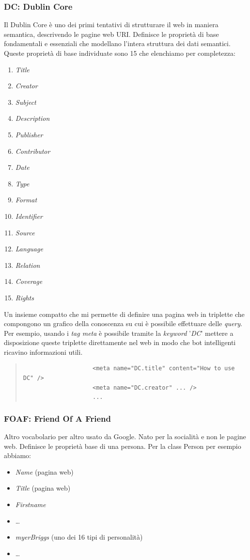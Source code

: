 				\subsubsection{DC: Dublin Core}
					Il Dublin Core è uno dei primi tentativi di strutturare il web in maniera semantica, descrivendo le pagine web URI. Definisce le proprietà di base fondamentali e essenziali che modellano l'intera struttura dei dati semantici. Queste proprietà di base individuate sono 15 che elenchiamo per completezza:
					\begin{enumerate}
						\item \emph{Title}
						\item \emph{Creator}
						\item \emph{Subject}
						\item \emph{Description}
						\item \emph{Publisher}
						\item \emph{Contributor}
						\item \emph{Date}
						\item \emph{Type}
						\item \emph{Format}
						\item \emph{Identifier}
						\item \emph{Source}
						\item \emph{Language}
						\item \emph{Relation}
						\item \emph{Coverage}
						\item \emph{Rights}
					\end{enumerate}
				Un insieme compatto che mi permette di definire una pagina web in triplette che compongono un grafico della conoscenza su cui è possibile effettuare delle \emph{query}.
				Per esempio, usando i \emph{tag meta} è possibile tramite la \emph{keyword} '\emph{DC}' mettere a disposizione queste triplette direttamente nel web in modo che bot intelligenti ricavino informazioni utili.
				\begin{quote}
				\begin{verbatim}
					<meta name="DC.title" content="How to use DC" />
					<meta name="DC.creator" ... />
					...
				\end{verbatim}
				\end{quote}
				
				\subsubsection{FOAF: Friend Of A Friend}
					Altro vocabolario per altro usato da Google. Nato per la socialità e non le pagine web. Definisce le proprietà base di una persona. Per la class Person per esempio abbiamo:
					\begin{itemize}
						\item \emph{Name} (pagina web)
						\item \emph{Title} (pagina web)
						\item \emph{Firstname}
						\item[] \dots
						\item \emph{myerBriggs} (uno dei 16 tipi di personalità)
						\item[] \dots
					\end{itemize}
					
